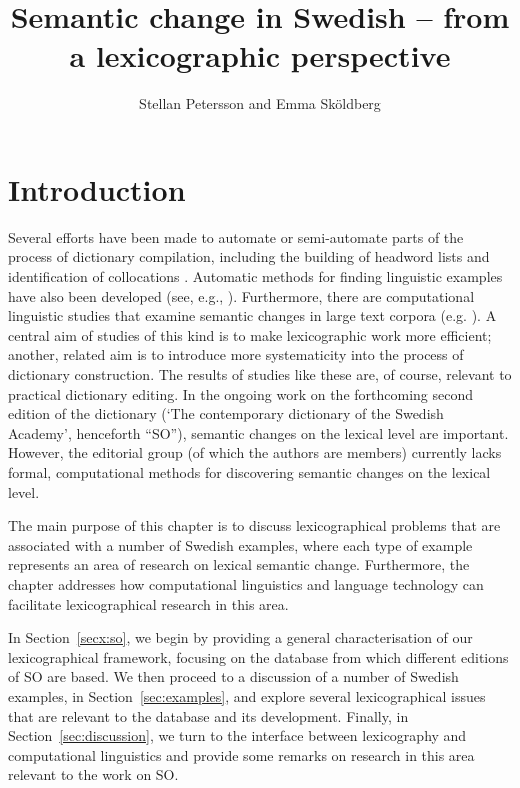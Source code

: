 \documentclass[output=paper]{langscibook}
\author{Stellan Petersson\affiliation{University of Gothenburg} and
Emma Sköldberg\affiliation{University of Gothenburg}}
\title{Semantic change in Swedish -- from a lexicographic perspective}
\begin{document}
\maketitle

\section{Introduction}
Several efforts have been made to automate or semi-automate parts of the process of dictionary compilation, including the building of headword lists and identification of collocations \citep{cook2014}. Automatic methods for finding linguistic examples have also been developed (see, e.g., \citealt{kilgarriff2008,pilan2016}). Furthermore, there are computational linguistic studies that examine semantic changes in large text corpora (e.g. \citealt{cavallin2012,cook13alexicographic,nimb2020}). A central aim of studies of this kind is to make lexicographic work more efficient; another, related aim is to introduce more systematicity into the process of dictionary construction. The results of studies like these are, of course, relevant to practical dictionary editing. In the ongoing work on the forthcoming second edition of the dictionary  (`The contemporary dictionary of the Swedish Academy', henceforth ``SO''),
semantic changes on the lexical level are important. However, the editorial group (of which the authors are members) currently lacks formal, computational methods for discovering semantic changes on the lexical level.

The main purpose of this chapter is to discuss lexicographical problems that are associated with a number of Swedish examples, where each type of example represents an area of research on lexical semantic change. Furthermore, the chapter addresses how computational linguistics and language technology can facilitate lexicographical research in this area. 

In Section~\ref{secx:so}, we begin by providing a general characterisation of our lexicographical framework, focusing on the database from which different editions of SO are based. We then proceed to a discussion of a number of Swedish examples, in Section~\ref{sec:examples}, and explore several lexicographical issues that are relevant to the database and its development. Finally, in Section~\ref{sec:discussion}, we turn to the interface between lexicography and computational linguistics and provide some remarks on research in this area relevant to the work on SO.    
 
\end{document}
